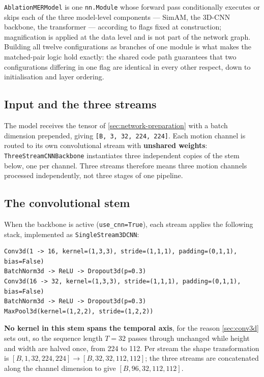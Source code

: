 \texttt{AblationMERModel} is one \texttt{nn.Module} whose forward pass conditionally executes or skips each of the three model-level components --- SimAM, the 3D-CNN backbone, the transformer --- according to flags fixed at construction; magnification is applied at the data level and is not part of the network graph. Building all twelve configurations as branches of one module is what makes the matched-pair logic hold exactly: the shared code path guarantees that two configurations differing in one flag are identical in every other respect, down to initialisation and layer ordering.

\subsection{Input and the three streams}
\label{sec:input-streams}

The model receives the tensor of \autoref{sec:network-preparation} with a batch dimension prepended, giving \texttt{[B, 3, 32, 224, 224]}. Each motion channel is routed to its own convolutional stream with \textbf{unshared weights}: \texttt{ThreeStreamCNNBackbone} instantiates three independent copies of the stem below, one per channel. Three streams therefore means three motion channels processed independently, not three stages of one pipeline.

\subsection{The convolutional stem}
\label{sec:conv-stem}

When the backbone is active (\texttt{use\_cnn=True}), each stream applies the following stack, implemented as \texttt{SingleStream3DCNN}:

\begin{verbatim}
Conv3d(1 -> 16, kernel=(1,3,3), stride=(1,1,1), padding=(0,1,1), bias=False)
BatchNorm3d -> ReLU -> Dropout3d(p=0.3)
Conv3d(16 -> 32, kernel=(1,3,3), stride=(1,1,1), padding=(0,1,1), bias=False)
BatchNorm3d -> ReLU -> Dropout3d(p=0.3)
MaxPool3d(kernel=(1,2,2), stride=(1,2,2))
\end{verbatim}

\textbf{No kernel in this stem spans the temporal axis}, for the reason \autoref{sec:conv3d} sets out, so the sequence length $T = 32$ passes through unchanged while height and width are halved once, from 224 to 112. Per stream the shape transformation is $[B,1,32,224,224] \rightarrow [B,32,32,112,112]$; the three streams are concatenated along the channel dimension to give $[B,96,32,112,112]$.

